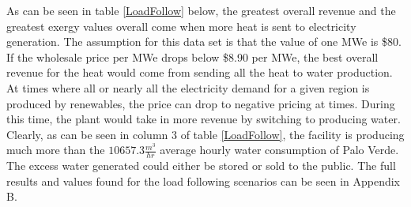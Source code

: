 As can be seen in table \ref{LoadFollow} below, the greatest overall revenue and the greatest exergy values overall come when more heat is sent to electricity generation.  The assumption for this data set is that the value of one MWe is \$80.  If the wholesale price per MWe drops below \$8.90 per MWe, the best overall revenue for the heat would come from sending all the heat to water production. At times where all or nearly all the electricity demand for a given region is produced by renewables, the price can drop to negative pricing at times.  During this time, the plant would take in more revenue by switching to producing water. Clearly, as can be seen in column 3 of table \ref{LoadFollow}, the facility is producing much more than the $10657.3 \frac{m^3}{hr}$ average hourly water consumption of Palo Verde.   The excess water generated could either be stored or sold to the public. The full results and values found for the load following scenarios can be seen in Appendix B.

